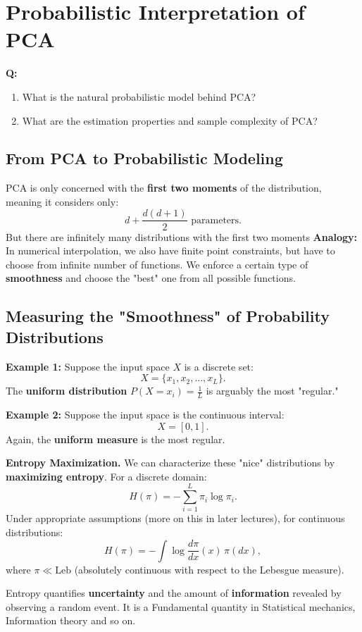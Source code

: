 \documentclass{article}
\begin{document}
\section{Probabilistic Interpretation of PCA}

\textbf{Q:}
\begin{enumerate}
    \item What is the natural probabilistic model behind PCA?
    \item What are the estimation properties and sample complexity of PCA?
\end{enumerate}

\subsection{From PCA to Probabilistic Modeling}
PCA is only concerned with the \textbf{first two moments} of the distribution, meaning it considers only:
    \[
    d + \frac{d(d+1)}{2} \text{ parameters.}
    \]
But there are infinitely many distributions with the first two moments
\textbf{Analogy: } In numerical interpolation, we also have finite point constraints, but have to choose from infinite number of functions. We enforce a certain type of \textbf{smoothness} and choose the "best" one from all possible functions. 

\subsection{Measuring the "Smoothness" of Probability Distributions}

\textbf{Example 1:} Suppose the input space \( X \) is a discrete set:
\[
X = \{x_1, x_2, \dots, x_L\}.
\]
The \textbf{uniform distribution} \( P(X = x_i) = \frac{1}{L} \) is arguably the most "regular."

\textbf{Example 2:} Suppose the input space is the continuous interval:
\[
X = [0,1].
\]
Again, the \textbf{uniform measure} is the most regular.


\textbf{Entropy Maximization.} We can characterize these "nice" distributions by \textbf{maximizing entropy}.
For a discrete domain:
\[
H(\pi) = - \sum_{i=1}^{L} \pi_i \log \pi_i.
\]
Under appropriate assumptions (more on this in later lectures), for continuous distributions:
\[
H(\pi) = - \int \log \frac{d\pi}{dx}(x) \, \pi(dx),
\]
where \( \pi \ll \text{Leb} \) (absolutely continuous with respect to the Lebesgue measure).

Entropy quantifies \textbf{uncertainty} and the amount of \textbf{information} revealed by observing a random event. It is a Fundamental quantity in Statistical mechanics, Information theory and so on.
\end{document}
